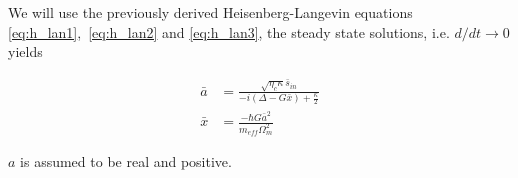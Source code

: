 We will use the previously derived Heisenberg-Langevin equations \eqref{eq:h_lan1},~\eqref{eq:h_lan2} and \eqref{eq:h_lan3}, the steady state solutions, i.e. $d/dt \rightarrow 0$ yields

\begin{align}
\bar{a} & = \frac{\sqrt{\eta_c\kappa}\bar{s}_{in}}{-i(\Delta - G\bar{x}) + \frac{\kappa}{2}} \label{eq:ss_a} \\
\bar{x} & = \frac{-\hbar G \bar{a}^2}{m_{eff}\Omega_m^2}
\label{eq:ss_x}
\end{align}

$a$ is assumed to be real and positive.